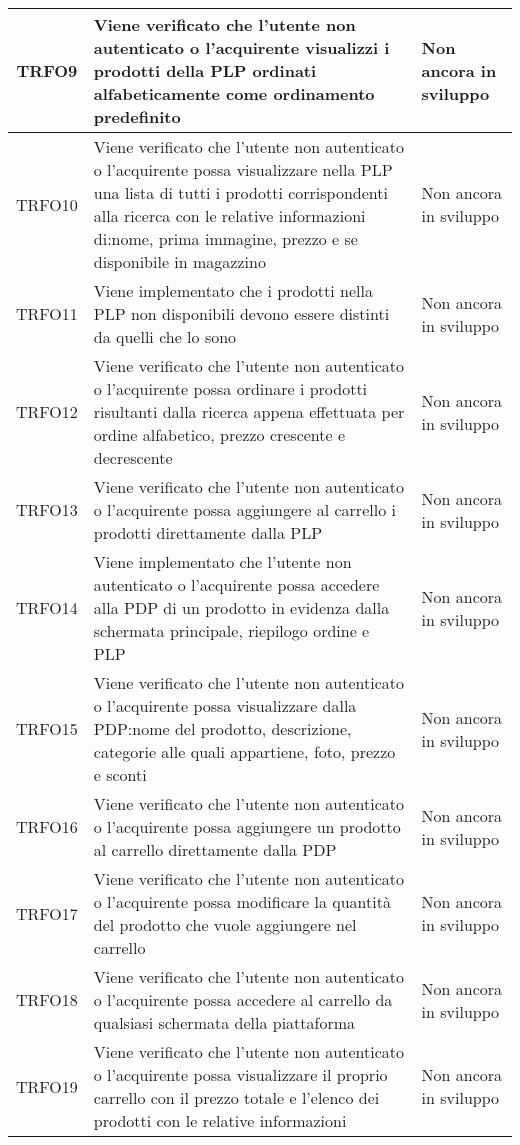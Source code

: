 \begin{longtable}{|c| C{10cm} |C{3cm}|}
	TRFO9 & Viene verificato che l'utente non autenticato o l'acquirente visualizzi i prodotti della PLP ordinati alfabeticamente come ordinamento predefinito & Non ancora in sviluppo\\ \hline
	TRFO10 & Viene verificato che l'utente non autenticato o l'acquirente possa visualizzare nella PLP una lista di tutti i prodotti corrispondenti alla ricerca con le relative informazioni di:nome, prima immagine, prezzo e se disponibile in magazzino & Non ancora in sviluppo \\ \hline
	TRFO11 & Viene implementato che i prodotti nella PLP non disponibili devono essere distinti da quelli che lo sono & Non ancora in sviluppo \\ \hline
	TRFO12 & Viene verificato che l'utente non autenticato o l'acquirente possa ordinare i prodotti risultanti dalla ricerca appena effettuata per ordine alfabetico, prezzo crescente e decrescente & Non ancora in sviluppo \\ \hline
	TRFO13 & Viene verificato che l'utente non autenticato o l'acquirente possa aggiungere al carrello i prodotti direttamente dalla PLP & Non ancora in sviluppo\\ \hline
	TRFO14 & Viene implementato che l'utente non autenticato o l'acquirente possa accedere alla PDP di un prodotto in evidenza dalla schermata principale, riepilogo ordine e PLP & Non ancora in sviluppo \\ \hline
	TRFO15 & Viene verificato che l'utente non autenticato o l'acquirente possa visualizzare dalla PDP:nome del prodotto, descrizione, categorie alle quali appartiene, foto, prezzo e sconti & Non ancora in sviluppo \\ \hline
	TRFO16 & Viene verificato che l'utente non autenticato o l'acquirente possa aggiungere un prodotto al carrello direttamente dalla PDP  & Non ancora in sviluppo\\ \hline
	TRFO17 & Viene verificato che l'utente non autenticato o l'acquirente possa modificare la quantità del prodotto che vuole aggiungere nel carrello & Non ancora in sviluppo\\ \hline
	TRFO18 & Viene verificato che l'utente non autenticato o l'acquirente possa accedere al carrello da qualsiasi schermata della piattaforma & Non ancora in sviluppo \\ \hline
           TRFO19 & Viene verificato che l'utente non autenticato o l'acquirente possa visualizzare il proprio carrello con il prezzo totale e l'elenco dei prodotti con le relative informazioni & Non ancora in sviluppo\\ \hline

\end{longtable}
